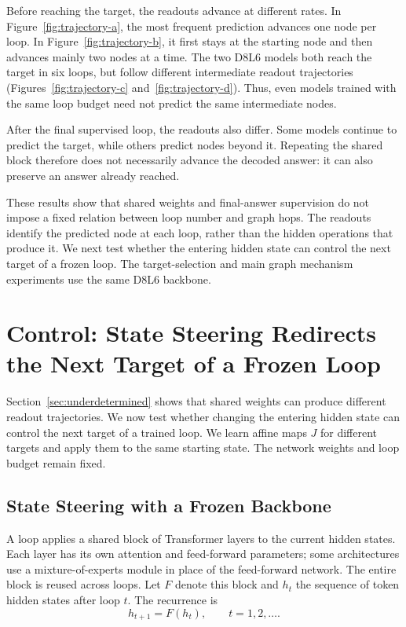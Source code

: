 \documentclass{article}
\begin{document}
Before reaching the target, the readouts advance at different rates. In Figure~\ref{fig:trajectory-a}, the most frequent prediction advances one node per loop. In Figure~\ref{fig:trajectory-b}, it first stays at the starting node and then advances mainly two nodes at a time. The two D8L6 models both reach the target in six loops, but follow different intermediate readout trajectories (Figures~\ref{fig:trajectory-c} and~\ref{fig:trajectory-d}). Thus, even models trained with the same loop budget need not predict the same intermediate nodes.

After the final supervised loop, the readouts also differ. Some models continue to predict the target, while others predict nodes beyond it. Repeating the shared block therefore does not necessarily advance the decoded answer: it can also preserve an answer already reached.

These results show that shared weights and final-answer supervision do not impose a fixed relation between loop number and graph hops. The readouts identify the predicted node at each loop, rather than the hidden operations that produce it. We next test whether the entering hidden state can control the next target of a frozen loop. The target-selection and main graph mechanism experiments use the same D8L6 backbone.

\section{Control: State Steering Redirects the Next Target of a Frozen Loop}
\label{sec:target}
Section~\ref{sec:underdetermined} shows that shared weights can produce different readout trajectories. We now test whether changing the entering hidden state can control the next target of a trained loop. We learn affine maps $J$ for different targets and apply them to the same starting state. The network weights and loop budget remain fixed.

\subsection{State Steering with a Frozen Backbone}
A loop applies a shared block of Transformer layers to the current hidden states. Each layer has its own attention and feed-forward parameters; some architectures use a mixture-of-experts module in place of the feed-forward network. The entire block is reused across loops. Let $F$ denote this block and $h_t$ the sequence of token hidden states after loop $t$. The recurrence is
\begin{equation}
 h_{t+1}=F(h_t), \qquad t=1,2,\ldots.
\end{equation}
\end{document}
